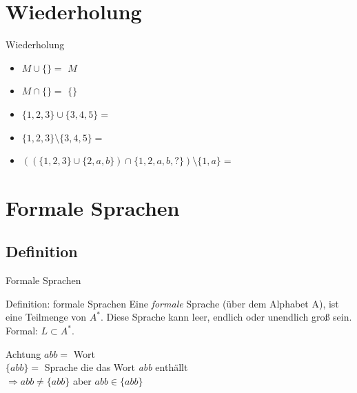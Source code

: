 	\section{Wiederholung} 
	\begin{frame} {Wiederholung}
		\begin{itemize}
			\item $M\cup \{\} =$  \only<2-> {\color{darkgreen}$M$}\\
			\color{black}
			\item $M\cap \{\} =$  \only<3-> {\color{darkgreen}$\{\}$}\\
			\color{black}
			\item $\{1,2,3\}\cup\{3,4,5\} =$  \only<4->{\color{darkgreen}$\{1,2,3,4,5\}$}\\
			\color{black}
			\item $\{1,2,3\}\setminus\{3,4,5\} =$  \only<5->{\color{darkgreen}$\{1,2\}$}\\
			\color{black}
			\item $((\{1,2,3\}\cup\{2,a,b\})\cap\{1,2,a,b,?\})\setminus \{1,a\}=$  \only<6->{\color{darkgreen}$\{2,b\}$}\\
		\end{itemize}
	\end{frame}
	
	
	\section{Formale Sprachen}
	\subsection{Definition}
	\begin{frame} {Formale Sprachen}
		\begin{block}{ Definition: formale Sprachen}
			Eine \textit{formale} Sprache (über dem Alphabet A), ist eine Teilmenge von $A^*$. Diese Sprache kann leer, endlich oder unendlich gro\ss{} sein.\\
			\vspace{5pt}
			Formal: $L\subset A^*$.
		\end{block}
		\begin{alertblock}{Achtung}
			$abb =$ Wort\\
			$\{abb\} =$ Sprache die das Wort \textit{abb} enthällt\\
			\vspace{5pt}
			$\Rightarrow abb \not= \{abb\}$ aber $abb \in \{abb\}$
		\end{alertblock}
	\end{frame}
	
